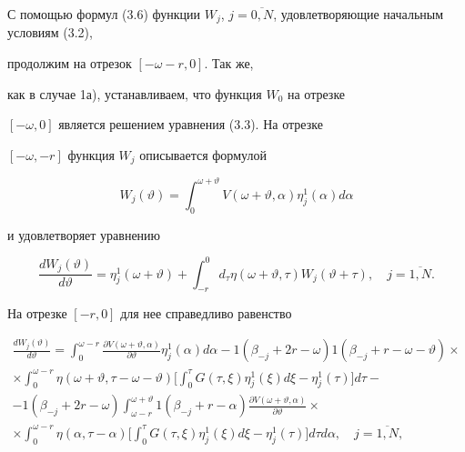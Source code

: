 С помощью формул (3.6) функции $W_{j}$, $j=


\overline{0,N}$, удовлетворяющие начальным условиям (3.2),


продолжим на отрезок $[-\omega-r,0]$. Так же,


как в случае 1а), устанавливаем, что функция $W_{0}$ на отрезке


$[-\omega,0]$ является решением уравнения (3.3). На отрезке


$[-\omega,-r]$ функция $W_{j}$ описывается формулой


$$


W_{j}(\vartheta) = \int_{0}^{\omega+ \vartheta}


V(\omega+ \vartheta, \alpha)


\eta_{j}^{1}(\alpha) d \alpha


$$


и удовлетворяет уравнению


$$


\frac{dW_{j}(\vartheta) }{d \vartheta} = \eta_{j}^{1}(\omega+ \vartheta)


+ \int_{-r}^{0}d_{\tau} \eta(\omega+ \vartheta, \tau)


W_{j}(\vartheta+ \tau), \quad j= \overline{1,N}.


$$


На отрезке $[-r,0]$ для нее справедливо равенство


\begin{multline*}


\frac{dW_{j}(\vartheta)}{d \vartheta} = \int_{0}^{\omega-r}


\frac{\partial V(\omega+ \vartheta, \alpha) }{\partial \vartheta}


\eta_{j}^{1}(\alpha) d \alpha- 1(\beta_{-j} + 2r - \omega)


1(\beta_{-j} +r- \omega-\vartheta) \times \\


%


\times \int_{0}^{\omega-r} \eta(\omega+ \vartheta, \tau-\omega-\vartheta)


\bigg[\int_{0}^{\tau} G(\tau, \xi) \eta_{j}^{1}(\xi) d \xi-


\eta_{j}^{1}(\tau)\bigg] d \tau - \\


%


-1(\beta_{-j} + 2r - \omega) \int_{\omega-r}^{\omega+ \vartheta}


1(\beta_{-j} +r- \alpha) \frac{\partial V(\omega+ \vartheta, \alpha)}


{\partial \vartheta} \times \\


%


\times \int_{0}^{\omega-r} \eta(\alpha, \tau- \alpha)


\bigg[\int_{0}^{\tau}G(\tau, \xi) \eta_{j}^{1}(\xi) d \xi-


\eta_{j}^{1}(\tau)\bigg]


d \tau d \alpha, \quad j= \overline{1,N},


\end{multline*}


